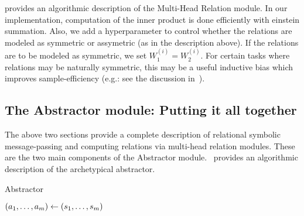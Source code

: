  provides an algorithmic description of the Multi-Head Relation module. In our implementation, computation of the inner product is done efficiently with einstein summation. Also, we add a hyperparameter to control whether the relations are modeled as symmetric or assymetric (as in the description above). If the relations are to be modeled as symmetric, we set $W_1^{(i)} = W_2^{(i)}$. For certain tasks where relations may be naturally symmetric, this may be a useful inductive bias which improves sample-efficiency (e.g.: see the discussion in~\cite{kerg2022neural}).

\subsection{The Abstractor module: Putting it all together}

The above two sections provide a complete description of relational symbolic message-passing and computing relations via multi-head relation modules. These are the two main components of the Abstractor module.~ provides an algorithmic description of the archetypical abstractor.

\begin{algorithm}[ht!]
	\caption{Abstractor}\label{alg:abstractor}

	\vspace{1em}

	\((a_1, \ldots, a_m) \gets (s_1, \ldots, s_m)\)

\end{algorithm}

